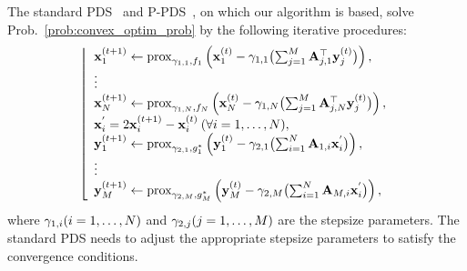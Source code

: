 \documentclass[10pt,journal]{IEEEtran}
\DeclareMathOperator{\prox}{prox}
\begin{document}
The standard PDS~\cite{Chambolle2011PDS, Condat2013PDS} and P-PDS~\cite{Pock2011PPDS}, on which our algorithm is based, solve Prob.~\eqref{prob:convex_optim_prob} by the following iterative procedures:
\begin{equation}
    \label{algo:P-PDS}
    \AlgoLfloor{
    \begin{array}{l}
        \VarPrimal{1}^{(\IndexAlg+1)} 
        \leftarrow \prox_{\ScalarStepsize{1, 1}, \FuncPrimal{1}}
        \left( \VarPrimal{1}^{(\IndexAlg)} - \ScalarStepsize{1,1} \bigl( \sum_{\IndexDual=1}^{\NumVarDual} \LinOpPPDS{\IndexDual,1}^{\top} \VarDual{\IndexDual}^{(\IndexAlg)} \bigr) \right), \\
        \vdots \\
        \VarPrimal{\NumVarPrimal}^{(\IndexAlg+1)} 
        \leftarrow \prox_{\ScalarStepsize{1, \NumVarPrimal}, \FuncPrimal{\NumVarPrimal}}
        \left( \VarPrimal{\NumVarPrimal}^{(\IndexAlg)} - \ScalarStepsize{1, \NumVarPrimal} \bigl( \sum_{\IndexDual=1}^{\NumVarDual} \LinOpPPDS{\IndexDual,\NumVarPrimal}^{\top} \VarDual{\IndexDual}^{(\IndexAlg)} \bigr) \right), \\
        \VarPrimal{\IndexPrimal}^{'} = 2\VarPrimal{\IndexPrimal}^{(\IndexAlg+1)} - \VarPrimal{\IndexPrimal}^{(\IndexAlg)} \: (\forall \IndexPrimal = 1, \ldots, \NumVarPrimal), \\
        \VarDual{1}^{(\IndexAlg+1)}
        \leftarrow \prox_{\ScalarStepsize{2, 1}, \FuncDual{1}^{*}}
        \left( \VarDual{1}^{(\IndexAlg)} - \ScalarStepsize{2, 1}
        \bigl(\sum_{\IndexPrimal=1}^{\NumVarPrimal} \LinOpPPDS{1,\IndexPrimal} \VarPrimal{\IndexPrimal}^{'} \bigr) \right), \\
        \vdots \\
        \VarDual{\NumVarDual}^{(\IndexAlg+1)}
        \leftarrow \prox_{\ScalarStepsize{2, \NumVarDual}, \FuncDual{\NumVarDual}^{*}}
        \left( \VarDual{\NumVarDual}^{(\IndexAlg)} - \ScalarStepsize{2, \NumVarDual}
        \bigl(\sum_{\IndexPrimal=1}^{\NumVarPrimal} \LinOpPPDS{\NumVarDual,\IndexPrimal}  \VarPrimal{\IndexPrimal}^{'} \bigr) \right), \\
    \end{array}
    }.
\end{equation}
where $\gamma_{1, i}(i = 1, \dots, N)$ and $\gamma_{2, j}(j = 1, \dots, M)$ are the stepsize parameters.
The standard PDS needs to adjust the appropriate stepsize parameters to satisfy the convergence conditions.
\end{document}
